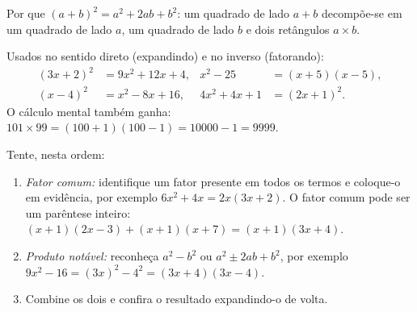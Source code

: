 \begin{omfigure}

{\small Por que $(a+b)^2 = a^2 + 2ab + b^2$: um quadrado de lado $a + b$
decompõe-se em um quadrado de lado $a$, um quadrado de lado $b$ e dois
retângulos $a \times b$.}
\end{omfigure}

\begin{example}\label{ex:g10:algebra:identities}
Usados no sentido direto (expandindo) e no inverso (fatorando):
\begin{align*}
(3x + 2)^2 &= 9x^2 + 12x + 4,
& x^2 - 25 &= (x+5)(x-5), \\
(x - 4)^2 &= x^2 - 8x + 16,
& 4x^2 + 4x + 1 &= (2x + 1)^2 .
\end{align*}
O cálculo mental também ganha: $101 \times 99 = (100+1)(100-1) =
10000 - 1 = 9999$.
\end{example}

\begin{method}\label{met:g10:algebra:factor}
Tente, nesta ordem:
\begin{enumerate}
  \item \emph{Fator comum:} identifique um fator presente em todos os
        termos e coloque-o em evidência, por exemplo
        $6x^2 + 4x = 2x(3x + 2)$. O fator comum pode ser um parêntese
        inteiro: $(x+1)(2x-3) + (x+1)(x+7) = (x+1)(3x+4)$.
  \item \emph{Produto notável:} reconheça $a^2 - b^2$ ou
        $a^2 \pm 2ab + b^2$, por exemplo $9x^2 - 16 = (3x)^2 - 4^2 =
        (3x+4)(3x-4)$.
  \item Combine os dois e confira o resultado expandindo-o de volta.
\end{enumerate}
\end{method}

